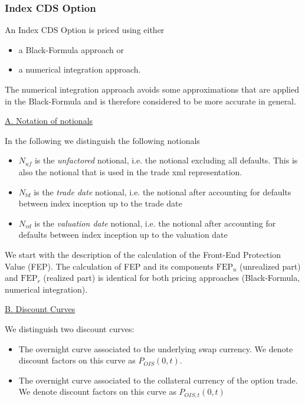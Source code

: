 \subsubsection{Index CDS Option}
\label{pricing:cr_indexcdsoption}

An Index CDS Option is priced using either

\begin{itemize}
\item a Black-Formula approach or
\item a numerical integration approach.
\end{itemize}

The numerical integration approach avoids some approximations that are applied in the Black-Formula and is therefore
considered to be more accurate in general.

\underline{A. Notation of notionals}

In the following we distinguish the following notionals

\begin{itemize}
\item $N_{uf}$ is the {\em unfactored} notional, i.e. the notional excluding all defaults. This is also the notional
  that is used in the trade xml representation.
\item $N_{td}$ is the {\em trade date} notional, i.e. the notional after accounting for defaults between index inception up to
  the trade date
\item $N_{vd}$ is the {\em valuation date} notional, i.e. the notional after accounting for defaults between index
  inception up to the valuation date
\end{itemize}

We start with the description of the calculation of the Front-End Protection Value (FEP). The calculation of FEP and its
components $\text{FEP}_u$ (unrealized part) and $\text{FEP}_r$ (realized part) is identical for both pricing approaches
(Black-Formula, numerical integration).

\underline{B. Discount Curves}

We distinguish two discount curves:

\begin{itemize}
\item The overnight curve associated to the underlying swap currency. We denote discount factors on this curve as
  $P_{OIS}(0,t)$.
\item The overnight curve associated to the collateral currency of the option trade. We denote discount factors on this
  curve as $P_{OIS,t}(0,t)$
\end{itemize}

